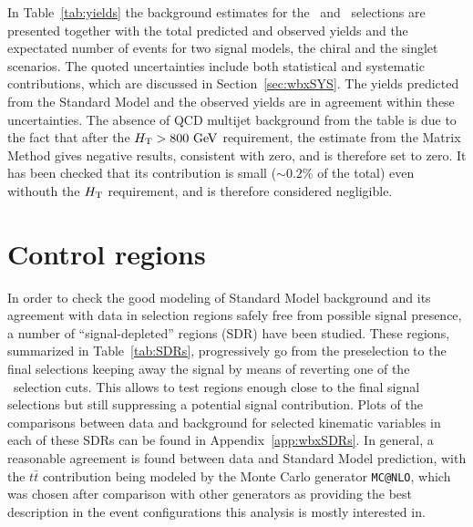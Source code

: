 In Table~\ref{tab:yields} the background estimates 
for the \loose\ and \tight\ selections are presented
together with the total predicted and observed yields
and the expectated number of events for two signal models, the
chiral and the singlet scenarios. 
The quoted uncertainties include both statistical and systematic contributions,
which are discussed in Section~\ref{sec:wbxSYS}.
The yields predicted from the Standard Model and the observed yields 
are in agreement within these uncertainties.
The absence of QCD multijet background from the table is due
to the fact that after the $\HT>800\gev$ requirement, the estimate
from the Matrix Method gives negative results, consistent with zero,
and is therefore set to zero.
It has been checked that its contribution is small ($\sim 0.2\%$ of the total)
even withouth the $\HT$ requirement, and is therefore considered negligible.



%



\section{Control regions}\label{sec:wbxCR}

In order to check the good modeling of Standard Model background
and its agreement with data in selection regions safely free from
possible signal presence, a number of ``signal-depleted'' regions (SDR) 
have been studied. These regions, summarized in Table~\ref{tab:SDRs},
progressively go from the preselection to the final selections keeping
away the signal by means of reverting one of the \tight\ selection cuts.
This allows to test regions enough close to the final signal selections
but still suppressing a potential signal contribution.
Plots of the comparisons between data and background for 
selected kinematic variables in each of these SDRs can be found in 
Appendix~\ref{app:wbxSDRs}.
In general, a reasonable agreement is found between data and Standard Model
prediction, with the $t\bar{t}$ contribution being modeled by the Monte Carlo 
generator \texttt{MC@NLO}, which was chosen after comparison with other
generators as providing the best description in the event configurations
this analysis is mostly interested in.

